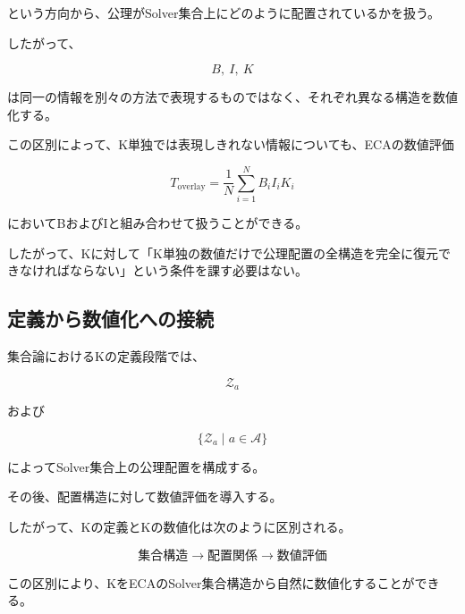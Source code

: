 という方向から、公理がSolver集合上にどのように配置されているかを扱う。

したがって、

\[
B,\ I,\ K
\]

は同一の情報を別々の方法で表現するものではなく、それぞれ異なる構造を数値化する。

この区別によって、K単独では表現しきれない情報についても、ECAの数値評価

\[
T_{\mathrm{overlay}} = \frac{1}{N}\sum_{i=1}^{N}B_iI_iK_i
\]

においてBおよびIと組み合わせて扱うことができる。

したがって、Kに対して「K単独の数値だけで公理配置の全構造を完全に復元できなければならない」という条件を課す必要はない。

\subsection{定義から数値化への接続}

集合論におけるKの定義段階では、

\[
\mathcal{Z}_a
\]

および

\[
\{\mathcal{Z}_a\mid a\in\mathcal{A}\}
\]

によってSolver集合上の公理配置を構成する。

その後、配置構造に対して数値評価を導入する。

したがって、Kの定義とKの数値化は次のように区別される。

\[
\boxed{
\text{集合構造}
\longrightarrow
\text{配置関係}
\longrightarrow
\text{数値評価}
}
\]

この区別により、KをECAのSolver集合構造から自然に数値化することができる。